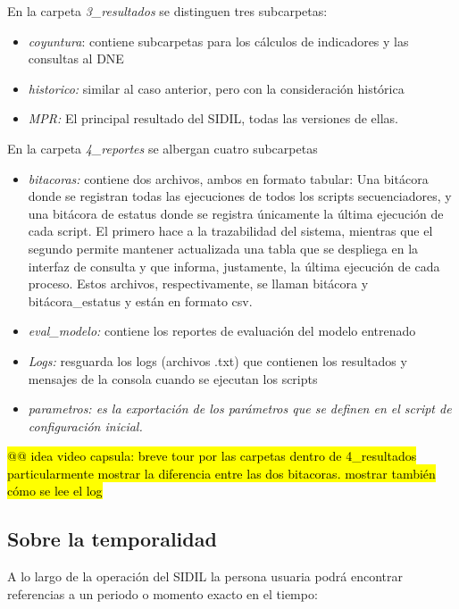 \documentclass[
]{article}
\begin{document}
En la carpeta \emph{3\_resultados} se distinguen tres subcarpetas:

\begin{itemize}
\item
  \emph{coyuntura}: contiene subcarpetas para los cálculos de indicadores y las consultas al DNE
\item
  \emph{historico:} similar al caso anterior, pero con la consideración histórica
\item
  \emph{MPR:} El principal resultado del SIDIL, todas las versiones de ellas.
\end{itemize}

En la carpeta \emph{4\_reportes} se albergan cuatro subcarpetas

\begin{itemize}
\item
  \emph{bitacoras:} contiene dos archivos, ambos en formato tabular: Una bitácora donde se registran todas las ejecuciones de todos los scripts secuenciadores, y una bitácora de estatus donde se registra únicamente la última ejecución de cada script. El primero hace a la trazabilidad del sistema, mientras que el segundo permite mantener actualizada una tabla que se despliega en la interfaz de consulta y que informa, justamente, la última ejecución de cada proceso. Estos archivos, respectivamente, se llaman bitácora y bitácora\_estatus y están en formato csv.
\item
  \emph{eval\_modelo:} contiene los reportes de evaluación del modelo entrenado
\item
  \emph{Logs:} resguarda los logs (archivos .txt) que contienen los resultados y mensajes de la consola cuando se ejecutan los scripts
\item
  \emph{parametros: es la exportación de los parámetros que se definen en el script de configuración inicial.}
\end{itemize}

\hl{@@ idea video capsula:
breve tour por las carpetas dentro de 4\_resultados
particularmente mostrar la diferencia entre las dos bitacoras.
mostrar también cómo se lee el log}

\hypertarget{temporalidad}{%
\subsection{Sobre la temporalidad}\label{temporalidad}}

A lo largo de la operación del SIDIL la persona usuaria podrá encontrar referencias a un periodo o momento exacto en el tiempo:
\end{document}

